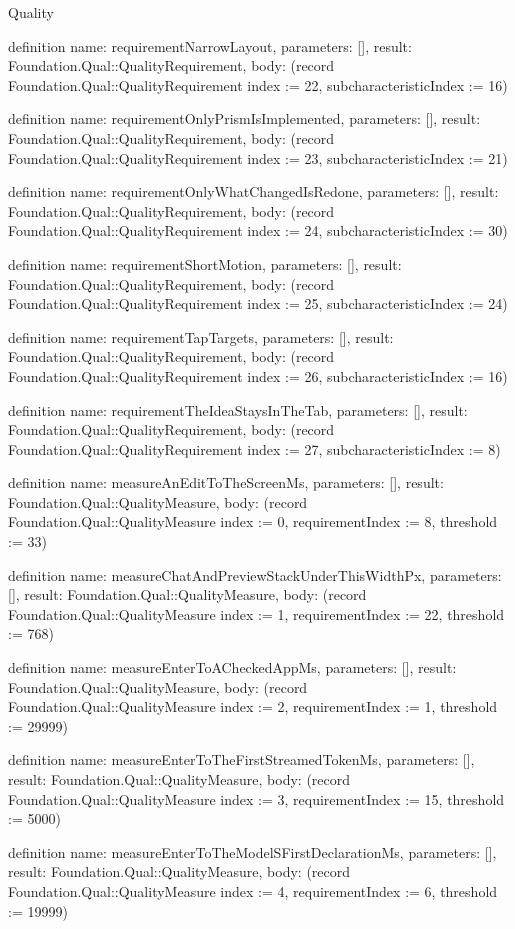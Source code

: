 \begin{lexlean}{Quality}
\begin{semanticmodule}
definition{
  name: requirementNarrowLayout,
  parameters: [],
  result: Foundation.Qual::QualityRequirement,
  body: (record Foundation.Qual::QualityRequirement {index := 22, subcharacteristicIndex := 16})
}

definition{
  name: requirementOnlyPrismIsImplemented,
  parameters: [],
  result: Foundation.Qual::QualityRequirement,
  body: (record Foundation.Qual::QualityRequirement {index := 23, subcharacteristicIndex := 21})
}

definition{
  name: requirementOnlyWhatChangedIsRedone,
  parameters: [],
  result: Foundation.Qual::QualityRequirement,
  body: (record Foundation.Qual::QualityRequirement {index := 24, subcharacteristicIndex := 30})
}

definition{
  name: requirementShortMotion,
  parameters: [],
  result: Foundation.Qual::QualityRequirement,
  body: (record Foundation.Qual::QualityRequirement {index := 25, subcharacteristicIndex := 24})
}

definition{
  name: requirementTapTargets,
  parameters: [],
  result: Foundation.Qual::QualityRequirement,
  body: (record Foundation.Qual::QualityRequirement {index := 26, subcharacteristicIndex := 16})
}

definition{
  name: requirementTheIdeaStaysInTheTab,
  parameters: [],
  result: Foundation.Qual::QualityRequirement,
  body: (record Foundation.Qual::QualityRequirement {index := 27, subcharacteristicIndex := 8})
}

definition{
  name: measureAnEditToTheScreenMs,
  parameters: [],
  result: Foundation.Qual::QualityMeasure,
  body: (record Foundation.Qual::QualityMeasure {index := 0, requirementIndex := 8, threshold := 33})
}

definition{
  name: measureChatAndPreviewStackUnderThisWidthPx,
  parameters: [],
  result: Foundation.Qual::QualityMeasure,
  body: (record Foundation.Qual::QualityMeasure {index := 1, requirementIndex := 22, threshold := 768})
}

definition{
  name: measureEnterToACheckedAppMs,
  parameters: [],
  result: Foundation.Qual::QualityMeasure,
  body: (record Foundation.Qual::QualityMeasure {index := 2, requirementIndex := 1, threshold := 29999})
}

definition{
  name: measureEnterToTheFirstStreamedTokenMs,
  parameters: [],
  result: Foundation.Qual::QualityMeasure,
  body: (record Foundation.Qual::QualityMeasure {index := 3, requirementIndex := 15, threshold := 5000})
}

definition{
  name: measureEnterToTheModelSFirstDeclarationMs,
  parameters: [],
  result: Foundation.Qual::QualityMeasure,
  body: (record Foundation.Qual::QualityMeasure {index := 4, requirementIndex := 6, threshold := 19999})
}


\end{semanticmodule}
\end{lexlean}
